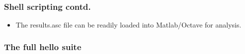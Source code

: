 \documentclass{beamer}
\begin{document}
\begin{frame}\frametitle{Shell scripting contd.}
  
  \begin{itemize}
    \item The results.asc file can be readily loaded into Matlab/Octave for analysis.
  \end{itemize}
\end{frame}

\begin{frame}\frametitle{The full hello suite}

\end{frame}
\end{document}
